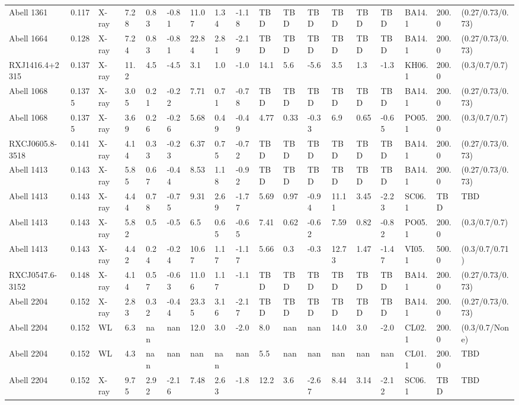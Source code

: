 \documentclass{article}
\begin{document}
\begin{center}
\begin{landscape}
\begin{longtable}{llllllllllllllllll}
Abell 1361 & 0.117 & X-ray & 7.28 & 0.83 & -0.81 & 11.07 & 1.34 & -1.18 & TBD & TBD & TBD & TBD & TBD & TBD & BA14.1 & 200.0 & (0.27/0.73/0.73) \\
Abell 1664 & 0.128 & X-ray & 7.24 & 0.83 & -0.81 & 22.84 & 2.81 & -2.19 & TBD & TBD & TBD & TBD & TBD & TBD & BA14.1 & 200.0 & (0.27/0.73/0.73) \\
RXJ1416.4+2315 & 0.137 & X-ray & 11.2 & 4.5 & -4.5 & 3.1 & 1.0 & -1.0 & 14.1 & 5.6 & -5.6 & 3.5 & 1.3 & -1.3 & KH06.1 & 200.0 & (0.3/0.7/0.7) \\
Abell 1068 & 0.1375 & X-ray & 3.05 & 0.21 & -0.22 & 7.71 & 0.71 & -0.78 & TBD & TBD & TBD & TBD & TBD & TBD & BA14.1 & 200.0 & (0.27/0.73/0.73) \\
Abell 1068 & 0.1375 & X-ray & 3.69 & 0.26 & -0.26 & 5.68 & 0.49 & -0.49 & 4.77 & 0.33 & -0.33 & 6.9 & 0.65 & -0.65 & PO05.1 & 200.0 & (0.3/0.7/0.7) \\
RXCJ0605.8-3518 & 0.141 & X-ray & 4.14 & 0.33 & -0.23 & 6.37 & 0.75 & -0.72 & TBD & TBD & TBD & TBD & TBD & TBD & BA14.1 & 200.0 & (0.27/0.73/0.73) \\
Abell 1413 & 0.143 & X-ray & 5.85 & 0.67 & -0.44 & 8.53 & 1.18 & -0.92 & TBD & TBD & TBD & TBD & TBD & TBD & BA14.1 & 200.0 & (0.27/0.73/0.73) \\
Abell 1413 & 0.143 & X-ray & 4.44 & 0.78 & -0.75 & 9.31 & 2.69 & -1.77 & 5.69 & 0.97 & -0.94 & 11.11 & 3.45 & -2.23 & SC06.1 & TBD & TBD \\
Abell 1413 & 0.143 & X-ray & 5.82 & 0.5 & -0.5 & 6.5 & 0.65 & -0.65 & 7.41 & 0.62 & -0.62 & 7.59 & 0.82 & -0.82 & PO05.1 & 200.0 & (0.3/0.7/0.7) \\
Abell 1413 & 0.143 & X-ray & 4.42 & 0.24 & -0.24 & 10.67 & 1.17 & -1.17 & 5.66 & 0.3 & -0.3 & 12.73 & 1.47 & -1.47 & VI05.1 & 500.0 & (0.3/0.7/0.71) \\
RXCJ0547.6-3152 & 0.148 & X-ray & 4.14 & 0.57 & -0.63 & 11.06 & 1.17 & -1.1 & TBD & TBD & TBD & TBD & TBD & TBD & BA14.1 & 200.0 & (0.27/0.73/0.73) \\
Abell 2204 & 0.152 & X-ray & 2.83 & 0.32 & -0.44 & 23.35 & 3.16 & -2.17 & TBD & TBD & TBD & TBD & TBD & TBD & BA14.1 & 200.0 & (0.27/0.73/0.73) \\
Abell 2204 & 0.152 & WL & 6.3 & nan & nan & 12.0 & 3.0 & -2.0 & 8.0 & nan & nan & 14.0 & 3.0 & -2.0 & CL02.1 & 200.0 & (0.3/0.7/None) \\
Abell 2204 & 0.152 & WL & 4.3 & nan & nan & nan & nan & nan & 5.5 & nan & nan & nan & nan & nan & CL01.1 & 200.0 & TBD \\
Abell 2204 & 0.152 & X-ray & 9.75 & 2.92 & -2.16 & 7.48 & 2.63 & -1.8 & 12.2 & 3.6 & -2.67 & 8.44 & 3.14 & -2.12 & SC06.1 & TBD & TBD \\

\end{longtable}
\end{landscape}
\end{center}
\end{document}
